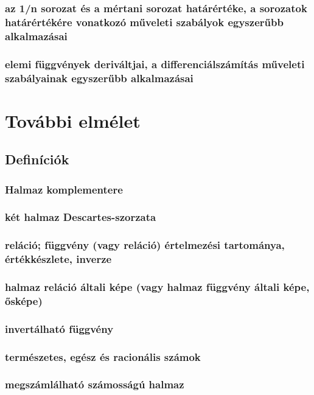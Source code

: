 \documentclass[12pt]{article}
\begin{document}
\subsubsection{az 1/n sorozat és a mértani sorozat határértéke, a sorozatok határértékére vonatkozó műveleti szabályok egyszerűbb alkalmazásai}
\subsubsection{elemi függvények deriváltjai, a differenciálszámítás műveleti szabályainak egyszerűbb alkalmazásai}


\section{További elmélet}

\subsection{Definíciók}

\subsubsection{Halmaz komplementere}
\subsubsection{két halmaz Descartes-szorzata}
\subsubsection{reláció; függvény (vagy reláció) értelmezési tartománya, értékkészlete, inverze}
\subsubsection{halmaz reláció általi képe (vagy halmaz függvény általi képe, ősképe)}
\subsubsection{invertálható függvény}
\subsubsection{természetes, egész és racionális számok}
\subsubsection{megszámlálható számosságú halmaz}
\end{document}
